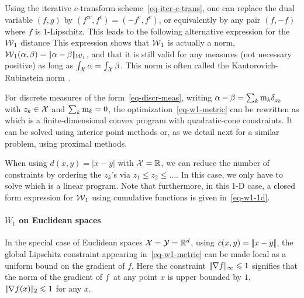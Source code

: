 Using the iterative $c$-transform scheme~\eqref{eq-iter-c-trans}, one can replace the dual variable $(f,g)$ by $(f^{cc},f^{c})=(-f^c, f^{c})$, or equivalently by any pair $(f,-f)$ where $f$ is $1$-Lipschitz. 
%
This leads to the following alternative expression for the $\operatorname{\mathcal{W}}_1$ distance
This expression shows that $\operatorname{\mathcal{W}}_1$ is actually a norm, \ie $\operatorname{\mathcal{W}}_1(\alpha,\beta) = |\!| \alpha-\beta |\!|_{\operatorname{\mathcal{W}}_1}$, and that it is still valid for any measures (not necessary positive) as long as $\int_{\mathcal{X}} \alpha=\int_{\mathcal{X}} \beta$. This norm is often called the Kantorovich-Rubinstein norm~\cite{kantorovich1958space}.

For discrete measures of the form~\eqref{eq-discr-meas}, writing $\alpha-\beta = \sum_{k} \mathrm{m}_k \delta_{z_k}$ with $z_k \in \mathcal{X}$ and $\sum_k \mathrm{m}_k=0$, the optimization~\eqref{eq-w1-metric} can be rewritten as
which is a finite-dimensional convex program with quadratic-cone constraints.  It can be solved using interior point methods or, as we detail next for a similar problem, using proximal methods. 

When using $d(x,y)=|x-y|$ with $\mathcal{X}=\mathbb{R}$, we can reduce the number of constraints by ordering the $z_k$'s via $z_1 \leq z_2 \leq \ldots$.  In this case, we only have to solve
which is a linear program. 
%
Note that furthermore, in this 1-D case, a closed form expression for $\operatorname{\mathcal{W}}_1$ using cumulative functions is given in~\eqref{eq-w1-1d}.

\paragraph{$W_1$ on Euclidean spaces}

In the special case of Euclidean spaces $\mathcal{X}=\mathcal{Y}=\mathbb{R}^d$, using $c(x,y) = |\!| x-y |\!|$, the global Lipschitz constraint appearing in~\eqref{eq-w1-metric} can be made local as a uniform bound on the gradient of $f$, 
Here the constraint $|\!| \nabla f |\!|_\infty \leqslant 1$ signifies that the norm of the gradient of $f$ at any point $x$ is upper bounded by $1$, $|\!| \nabla f(x) |\!|_2 \leqslant 1$ for any $x$.

